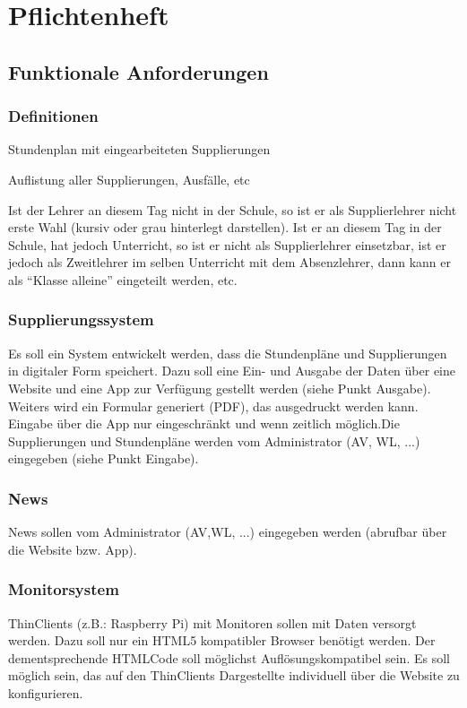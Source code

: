 \chapter{Pflichtenheft}

\section{Funktionale Anforderungen}

\subsection{Definitionen}
\begin{description}[style=nextline]
	\item[angepasster Stundenplan]
		Stundenplan mit eingearbeiteten Supplierungen 
	\item[tabellarischer Supplierplan]
		Auflistung aller Supplierungen, Ausfälle, etc
	\item[Relevanz bei Ersatzlehrern]
		Ist der Lehrer an diesem Tag nicht in der Schule, so ist er als Supplierlehrer nicht erste Wahl (kursiv oder grau hinterlegt darstellen). Ist er an diesem Tag in der Schule, hat jedoch Unterricht, so ist er nicht als Supplierlehrer einsetzbar, ist er jedoch als Zweitlehrer im selben Unterricht mit dem Absenzlehrer, dann kann er als \enquote{Klasse alleine} eingeteilt werden, etc.
\end{description}

\subsection{Supplierungssystem}
Es soll ein System entwickelt werden, dass die Stundenpläne und Supplierungen in digitaler Form speichert. Dazu soll eine Ein- und Ausgabe der Daten über eine Website und eine App zur Verfügung gestellt werden (siehe Punkt Ausgabe). Weiters wird ein Formular generiert (PDF), das ausgedruckt werden kann.\\
Eingabe über die App nur eingeschränkt und wenn zeitlich möglich.Die Supplierungen und Stundenpläne werden vom Administrator (AV, WL, ...) eingegeben (siehe Punkt Eingabe).

\subsection{News}
News sollen vom Administrator (AV,WL, ...) eingegeben werden (abrufbar über die Website bzw. App).

\subsection{Monitorsystem}
Thin­Clients (z.B.: Raspberry Pi) mit Monitoren sollen mit Daten versorgt werden. Dazu soll nur ein HTML5 kompatibler Browser benötigt werden. Der dementsprechende HTML­Code soll möglichst Auflösungskompatibel sein.
Es soll möglich sein, das auf den Thin­Clients Dargestellte individuell über die Website zu 
konfigurieren.\\

